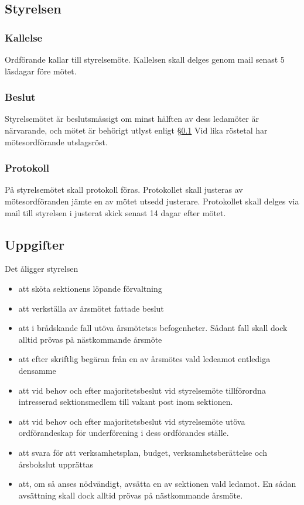 \documentclass{../resources/dgovdoc}
\begin{document}
\subsection{Styrelsen}
\label{sec:styrelsen}

\subsubsection{Kallelse}

Ordförande kallar till styrelsemöte. Kallelsen skall delges genom mail senast 5 läsdagar före mötet.

\subsubsection{Beslut}

Styrelsemötet är beslutsmässigt om minst hälften av dess ledamöter är närvarande, och
mötet är behörigt utlyst enligt \S\ref{sec:styrelsen} Vid lika röstetal har
mötesordförande utslagsröst.

\subsubsection{Protokoll}

På styrelsemötet skall protokoll föras. Protokollet skall justeras av mötesordföranden
jämte en av mötet utsedd justerare. Protokollet skall delges via mail till styrelsen i justerat skick senast 14 dagar efter
mötet.

\subsection{Uppgifter}

Det åligger styrelsen

\begin{itemize}
  \item att sköta sektionens löpande förvaltning
  \item att verkställa av årsmötet fattade beslut
  \item att i brådskande fall utöva årsmötets:s befogenheter. Sådant fall skall dock
    alltid prövas på nästkommande årsmöte
  \item att efter skriftlig begäran från en av årsmötes vald ledeamot entlediga
    densamme
  \item att vid behov och efter majoritetsbeslut vid styrelsemöte tillförordna
    intresserad sektionsmedlem till vakant post inom sektionen.
  \item att vid behov och efter majoritetsbeslut vid styrelsemöte utöva ordförandeskap
    för underförening i dess ordförandes ställe.
  \item att svara för att verksamhetsplan, budget, verksamhetsberättelse och
    årsbokslut upprättas
  \item att, om så anses nödvändigt, avsätta en av sektionen vald ledamot.
    En sådan avsättning skall dock alltid prövas på nästkommande årsmöte.
\end{itemize}
\end{document}
